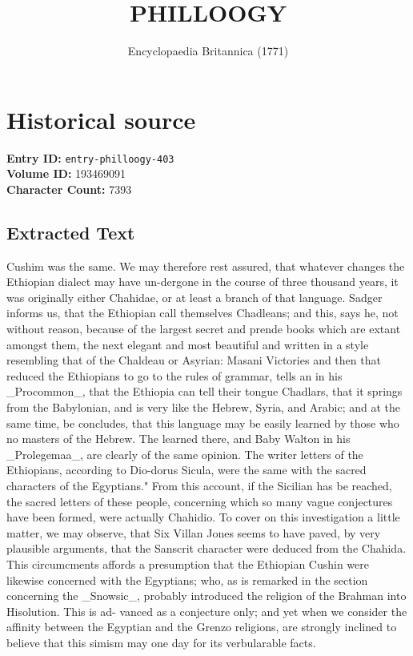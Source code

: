 \documentclass{article}
\title{PHILLOOGY}
\date{Encyclopaedia Britannica (1771)}
\begin{document}
\maketitle

\section*{Historical source}
\textbf{Entry ID:} \texttt{entry-philloogy-403} \\
\textbf{Volume ID:} 193469091 \\
\textbf{Character Count:} 7393

\subsection*{Extracted Text}
Cushim was the same. We may therefore rest assured, that whatever changes the Ethiopian dialect may have un-dergone in the course of three thousand years, it was originally either Chahidae, or at least a branch of that language. Sadger informs us, that the Ethiopian call themselves Chadleans; and this, says he, not without reason, because of the largest secret and prende books which are extant amongst them, the next elegant and most beautiful and written in a style resembling that of the Chaldeau or Asyrian: Masani Victories and then that reduced the Ethiopians to go to the rules of grammar, tells an in his \_Procommon\_, that the Ethiopia can tell their tongue Chadlars, that it springs from the Babylonian, and is very like the Hebrew, Syria, and Arabic; and at the same time, be concludes, that this language may be easily learned by those who no masters of the Hebrew. The learned there, and Baby Walton in his \_Prolegemaa\_, are clearly of the same opinion. The writer letters of the Ethiopians, according to Dio-dorus Sicula, were the same with the sacred characters of the Egyptians." From this account, if the Sicilian has be reached, the sacred letters of these people, concerning which so many vague conjectures have been formed, were actually Chahidio. To cover on this investigation a little matter, we may observe, that Six Villan Jones seems to have paved, by very plausible arguments, that the Sanscrit character were deduced from the Chahida. This circumcments affords a presumption that the Ethiopian Cushin were likewise concerned with the Egyptians; who, as is remarked in the section concerning the \_Snowsic\_, probably introduced the religion of the Brahman into Hisolution. This is ad- vanced as a conjecture only; and yet when we consider the affinity between the Egyptian and the Grenzo religions, are strongly inclined to believe that this simism may one day for its verbularable facts.
\end{document}
